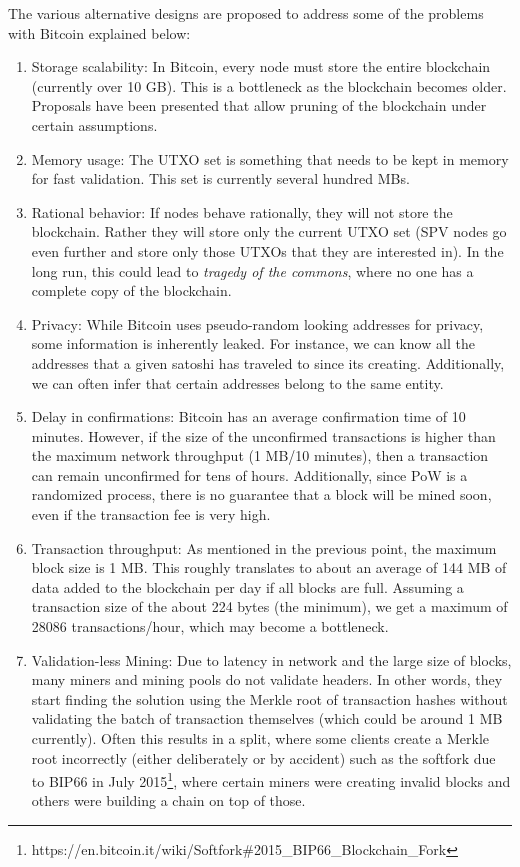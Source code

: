 \documentclass[]{report}   %
\begin{document}
The various alternative designs are proposed to address some of the problems with Bitcoin explained below:
\begin{enumerate}
	\item Storage scalability: In Bitcoin, every node must store the entire blockchain (currently over 10 GB). This is a bottleneck as the blockchain becomes older. Proposals have been presented that allow pruning of the blockchain under certain assumptions. 
	\item Memory usage: The UTXO set is something that needs to be kept in memory for fast validation. This set is currently several hundred MBs.
	\item Rational behavior: If nodes behave rationally, they will not store the blockchain. Rather they will store only the current UTXO set (SPV nodes go even further and store only those UTXOs that they are interested in). In the long run, this could lead to {\em tragedy of the commons}, where no one has a complete copy of the blockchain.
	\item Privacy: While Bitcoin uses pseudo-random looking addresses for privacy, some information is inherently leaked. For instance, we can know all the addresses that a given satoshi has traveled to since its creating. Additionally, we can often infer that certain addresses belong to the same entity.
	\item Delay in confirmations: Bitcoin has an average confirmation time of 10 minutes. However, if the size of the unconfirmed transactions is higher than the maximum network throughput (1 MB/10 minutes), then a transaction can remain unconfirmed for tens of hours. Additionally, since PoW is a randomized process, there is no guarantee that a block will be mined soon, even if the transaction fee is very high.
	\item Transaction throughput: As mentioned in the previous point, the maximum block size is 1 MB. This roughly translates to about an average of 144 MB of data added to the blockchain per day if all blocks are full. Assuming a transaction size of the about 224 bytes (the minimum), we get a maximum of 28086 transactions/hour, which may become a bottleneck. %
	\item Validation-less Mining: Due to latency in network and the large size of blocks, many miners and mining pools do not validate headers. In other words, they start finding the solution using the Merkle root of transaction hashes without validating the batch of transaction themselves (which could be around 1 MB currently). Often this results in a split, where some clients create a Merkle root incorrectly (either deliberately or by accident) such as the softfork due to BIP66 in July 2015\footnote{https://en.bitcoin.it/wiki/Softfork\#2015\_BIP66\_Blockchain\_Fork}, where certain miners were creating invalid blocks and others were building a chain on top of those.

\end{enumerate}
\end{document}
